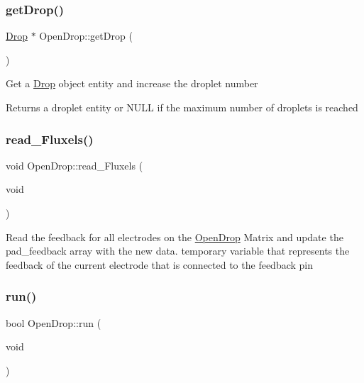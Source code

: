 \subsubsection{\texorpdfstring{get\+Drop()}{getDrop()}}
{\footnotesize\ttfamily \mbox{\hyperlink{class_drop}{Drop}} $\ast$ Open\+Drop\+::get\+Drop (\begin{DoxyParamCaption}{ }\end{DoxyParamCaption})}

Get a \mbox{\hyperlink{class_drop}{Drop}} object entity and increase the droplet number \begin{DoxyReturn}{Returns}
a droplet entity or N\+U\+LL if the maximum number of droplets is reached 
\end{DoxyReturn}
\mbox{\label{class_open_drop_a4b531b2101497f257cf80338ecf9536c}} 
\subsubsection{\texorpdfstring{read\+\_\+\+Fluxels()}{read\_Fluxels()}}
{\footnotesize\ttfamily void Open\+Drop\+::read\+\_\+\+Fluxels (\begin{DoxyParamCaption}\item[{void}]{ }\end{DoxyParamCaption})}

Read the feedback for all electrodes on the \mbox{\hyperlink{class_open_drop}{Open\+Drop}} Matrix and update the pad\+\_\+feedback array with the new data.   temporary variable that represents the feedback of the current electrode that is connected to the feedback pin\mbox{\label{class_open_drop_ab9249d33a60f3527cf43a243e84f9fde}} 
\subsubsection{\texorpdfstring{run()}{run()}}
{\footnotesize\ttfamily bool Open\+Drop\+::run (\begin{DoxyParamCaption}\item[{void}]{ }\end{DoxyParamCaption})}


